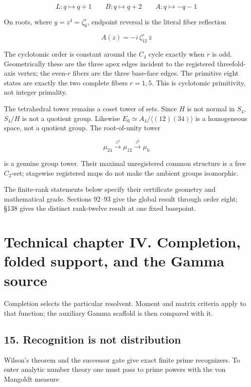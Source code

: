 \documentclass[
  11pt,
]{book}
\begin{document}
\[
L:q\mapsto q+1
\qquad
B:q\mapsto q+2
\qquad
A:q\mapsto-q-1
\tag{78.10}
\]

On roots, where \(y=z^4=\zeta_6^r\), endpoint reversal is the literal
fiber reflection

\[
\boxed{A(z)=-i\,\zeta_{12}^{r}\,\overline z}
\tag{78.11}
\]

The cyclotomic order is constant around the \(C_4\) cycle exactly when
\(r\) is odd. Geometrically these are the three apex edges incident to
the registered threefold-axis vertex; the even-\(r\) fibers are the
three base-face edges. The primitive eight states are exactly the two
complete fibers \(r=1,5\). This is cyclotomic primitivity, not integer
primality.

The tetrahedral tower remains a coset tower of sets. Since \(H\) is not
normal in \(S_4\), \(S_4/H\) is not a quotient group. Likewise
\(E_6\simeq A_4/\langle(12)(34)\rangle\) is a homogeneous space, not a
quotient group. The root-of-unity tower

\[
\mu_{24}\xrightarrow{z^2}\mu_{12}\xrightarrow{z^2}\mu_6
\]

is a genuine group tower. Their maximal unregistered common structure is
a free \(C_2\)-set; stagewise registered maps do not make the ambient
groups isomorphic.

The finite-rank statements below specify their certificate geometry and
mathematical grade. Sections 92--93 give the global result through order
eight; §138 gives the distinct rank-twelve result at one fixed
basepoint.


\chapter{Technical chapter IV. Completion, folded support, and the Gamma
source}\label{technical-chapter-iv.-completion-folded-support-and-the-gamma-source}

Completion selects the particular resolvent. Moment and matrix criteria
apply to that function; the auxiliary Gamma scaffold is then compared
with it.

\section{15. Recognition is not
distribution}\label{recognition-is-not-distribution}

Wilson's theorem and the successor gate give exact finite prime
recognizers. To enter analytic number theory one must pass to prime
powers with the von Mangoldt measure
\end{document}
